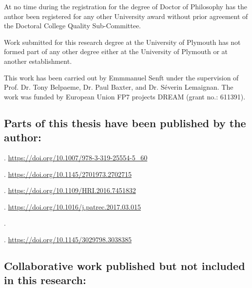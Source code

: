 At no time during the registration for the degree of Doctor of Philosophy has the author been registered for any other University award without prior agreement of the Doctoral College Quality Sub-Committee. 

Work submitted for this research degree at the University of Plymouth has not formed part of any other degree either at the University of Plymouth or at another establishment.

This work has been carried out by Emmmanuel Senft under the supervision of Prof.
Dr. Tony Belpaeme, Dr. Paul Baxter, and Dr. S\'{e}verin Lemaignan. The work was
funded by European Union FP7 projects DREAM (grant no.: 611391).

\subsection*{Parts of this thesis have been published by the author:}


. \url{https://doi.org/10.1007/978-3-319-25554-5\_60}

. \url{https://doi.org/10.1145/2701973.2702715}

. \url{https://doi.org/10.1109/HRI.2016.7451832}


. \url{https://doi.org/10.1016/j.patrec.2017.03.015}

.

. \url{https://doi.org/10.1145/3029798.3038385}



\subsection*{Collaborative work published but not included in this research:}







